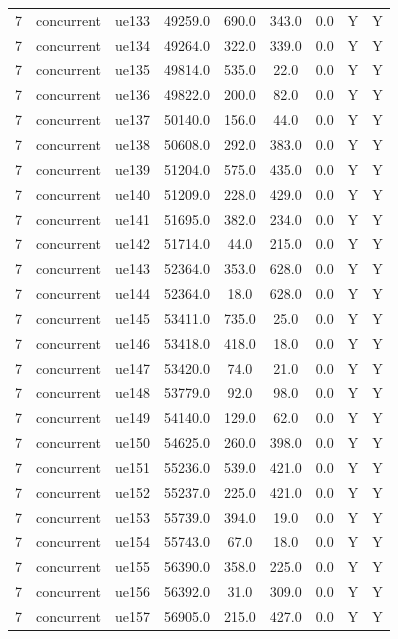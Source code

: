 \begin{table}[ht]
\begin{tabular}{|c|c|c|c|c|c|c|c|c|}
7 & concurrent & ue133 & 49259.0 & 690.0 & 343.0 & 0.0 & Y & Y \\
7 & concurrent & ue134 & 49264.0 & 322.0 & 339.0 & 0.0 & Y & Y \\
7 & concurrent & ue135 & 49814.0 & 535.0 & 22.0 & 0.0 & Y & Y \\
7 & concurrent & ue136 & 49822.0 & 200.0 & 82.0 & 0.0 & Y & Y \\
7 & concurrent & ue137 & 50140.0 & 156.0 & 44.0 & 0.0 & Y & Y \\
7 & concurrent & ue138 & 50608.0 & 292.0 & 383.0 & 0.0 & Y & Y \\
7 & concurrent & ue139 & 51204.0 & 575.0 & 435.0 & 0.0 & Y & Y \\
7 & concurrent & ue140 & 51209.0 & 228.0 & 429.0 & 0.0 & Y & Y \\
7 & concurrent & ue141 & 51695.0 & 382.0 & 234.0 & 0.0 & Y & Y \\
7 & concurrent & ue142 & 51714.0 & 44.0 & 215.0 & 0.0 & Y & Y \\
7 & concurrent & ue143 & 52364.0 & 353.0 & 628.0 & 0.0 & Y & Y \\
7 & concurrent & ue144 & 52364.0 & 18.0 & 628.0 & 0.0 & Y & Y \\
7 & concurrent & ue145 & 53411.0 & 735.0 & 25.0 & 0.0 & Y & Y \\
7 & concurrent & ue146 & 53418.0 & 418.0 & 18.0 & 0.0 & Y & Y \\
7 & concurrent & ue147 & 53420.0 & 74.0 & 21.0 & 0.0 & Y & Y \\
7 & concurrent & ue148 & 53779.0 & 92.0 & 98.0 & 0.0 & Y & Y \\
7 & concurrent & ue149 & 54140.0 & 129.0 & 62.0 & 0.0 & Y & Y \\
7 & concurrent & ue150 & 54625.0 & 260.0 & 398.0 & 0.0 & Y & Y \\
7 & concurrent & ue151 & 55236.0 & 539.0 & 421.0 & 0.0 & Y & Y \\
7 & concurrent & ue152 & 55237.0 & 225.0 & 421.0 & 0.0 & Y & Y \\
7 & concurrent & ue153 & 55739.0 & 394.0 & 19.0 & 0.0 & Y & Y \\
7 & concurrent & ue154 & 55743.0 & 67.0 & 18.0 & 0.0 & Y & Y \\
7 & concurrent & ue155 & 56390.0 & 358.0 & 225.0 & 0.0 & Y & Y \\
7 & concurrent & ue156 & 56392.0 & 31.0 & 309.0 & 0.0 & Y & Y \\
7 & concurrent & ue157 & 56905.0 & 215.0 & 427.0 & 0.0 & Y & Y \\

\end{tabular}
\end{table}
